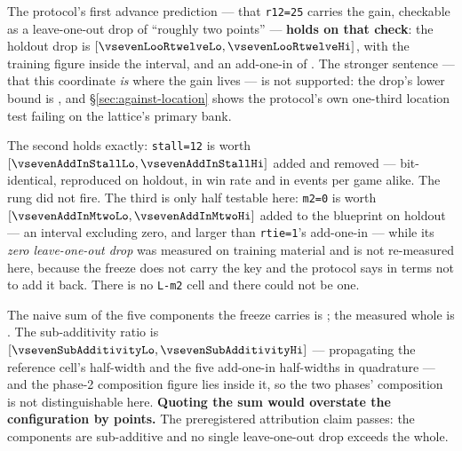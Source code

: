 \begin{table}[t]\centering
\caption{The attribution lattice. Add-one-in is measured from the deployed policy; leave-one-out is
the drop from \frozen{}. Reference cell \frozen{} against \incumbent{} on the lattice banks:
\vsevenBfiveWhole{} $[\vsevenBfiveWholeLo, \vsevenBfiveWholeHi]$.}
\label{tab:attribution}
{\small}
\end{table}

The protocol's first advance prediction --- that \texttt{r12=25} carries the gain, checkable as a
leave-one-out drop of ``roughly two points'' --- \textbf{holds on that check}: the holdout drop is
\vsevenLooRtwelve{} $[\vsevenLooRtwelveLo, \vsevenLooRtwelveHi]$, with the training figure
\vsevenTrainRtwelveLoo{} inside the interval, and an add-one-in of \vsevenAddInRtwelve{}. The
stronger sentence --- that this coordinate \emph{is} where the gain lives --- is not supported: the
drop's lower bound is \vsevenLooRtwelveLo{}, and \S\ref{sec:against-location} shows the
protocol's own one-third location test failing on the lattice's primary bank.

The second holds exactly: \texttt{stall=12} is worth \vsevenAddInStall{}
$[\vsevenAddInStallLo, \vsevenAddInStallHi]$ added and \vsevenLooStall{} removed --- bit-identical,
reproduced on holdout, in win rate and in events per game alike. The rung did not fire. The third is only half testable here: \texttt{m2=0} is worth \vsevenAddInMtwo{}
$[\vsevenAddInMtwoLo, \vsevenAddInMtwoHi]$ added to the blueprint on holdout --- an interval
excluding zero, and larger than \texttt{rtie=1}'s add-one-in --- while its \emph{zero leave-one-out
drop} was measured on training material and is not re-measured here, because the freeze does not
carry the key and the protocol says in terms not to add it back. There is no \texttt{L-m2} cell and
there could not be one.

The naive sum of the five components the freeze carries is \vsevenBfiveSum{}; the measured whole is
\vsevenBfiveWhole{}. The sub-additivity ratio is \vsevenSubAdditivity{}
$[\vsevenSubAdditivityLo, \vsevenSubAdditivityHi]$ --- propagating the reference cell's half-width
and the five add-one-in half-widths in quadrature --- and the phase-2 composition figure
\vsevenSubAddPhaseTwo{} lies inside it, so the two phases' composition is not distinguishable here. \textbf{Quoting the sum would overstate the configuration by
\vsevenSubAdditivityOverstate{} points.} The preregistered attribution claim passes: the components are
sub-additive and no single leave-one-out drop exceeds the whole.

